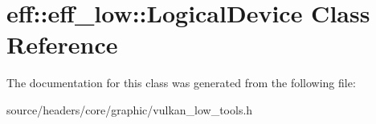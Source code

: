 \hypertarget{classeff_1_1eff__low_1_1LogicalDevice}{}\section{eff\+:\+:eff\+\_\+low\+:\+:Logical\+Device Class Reference}
\label{classeff_1_1eff__low_1_1LogicalDevice}


The documentation for this class was generated from the following file\+:\begin{DoxyCompactItemize}
\item 
source/headers/core/graphic/vulkan\+\_\+low\+\_\+tools.\+h\end{DoxyCompactItemize}
